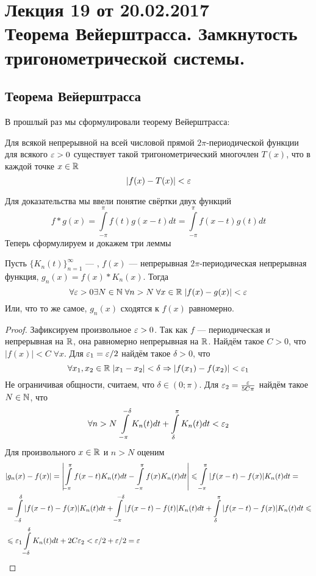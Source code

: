 \pagestyle{fancy}
\section{Лекция 19 от 20.02.2017 \\  Теорема Вейерштрасса. Замкнутость тригонометрической системы.}
\subsection{Теорема Вейерштрасса}
В прошлый раз мы сформулировали теорему Вейерштрасса:
\begin{Theorem}
	Для всякой непрерывной на всей числовой прямой $2\pi$-периодической функции для всякого $\varepsilon>0$ существует такой тригонометрический многочлен $T(x)$, что в каждой точке $x \in \mathbb{R}$ $$
	 |f(x)-T(x)| < \varepsilon
	$$
\end{Theorem}
	Для доказательства мы ввели понятие свёртки двух функций
	$$
		f*g(x) = \int\limits_{-\pi}^{\pi} f(t)g(x-t)dt = \int\limits_{-\pi}^{\pi}f(x-t)g(t)dt
	$$
	Теперь сформулируем и докажем три леммы
\begin{Lemma}
	Пусть $\{K_n(t)\}_{n=1}^{\infty}$ --- \lmao, $f(x)$ --- непрерывная $2\pi$-периодическая непрерывная функция, $g_n(x) = f(x)*K_n(x)$. Тогда 
	$$
		\forall \varepsilon>0 \exists N\in \mathbb{N}\; \forall n>N\; \forall x\in\mathbb{R}\; |f(x) - g(x)| < \varepsilon
	$$
	Или, что то же самое, $g_n(x)$ сходятся к $f(x)$ равномерно.
	\begin{proof}
		Зафиксируем произвольное $\varepsilon > 0$. Так как $f$ --- периодическая и непрерывная на $\mathbb{R}$, она равномерно непрерывная на $\mathbb{R}$. Найдём такое $C>0$, что $|f(x)| <C\; \forall x$. Для $\varepsilon_1 = \varepsilon/2$ найдём такое $\delta > 0$, что
		$$
			\forall x_1, x_2\in  \mathbb{R}\; |x_1-x_2| < \delta \Rightarrow |f(x_1) - f(x_2)| < \varepsilon_1 
		$$
		Не ограничивая общности, считаем, что $\delta \in (0; \pi)$.
		Для $\varepsilon_2 = \frac{\varepsilon}{5C\pi}$ найдём такое $N\in \mathbb{N}$, что
		$$
			\forall n>N\; \int\limits_{-\pi}^{-\delta}  K_n(t)dt+ \int\limits_{\delta}^{\pi} K_n(t)dt < \varepsilon_2
		$$
		Для произвольного $x\in \mathbb{R}$ и $n >N$ оценим
		\begin{align*}
			&|g_n(x) - f(x)|= \left| \int \limits_{-\pi}^{\pi}f(x-t)K_n(t)dt - \int \limits_{-\pi}^{\pi}f(x)K_n(t)dt\right| \leqslant \int \limits_{-\pi}^{\pi}|f(x-t) -f(x)|K_n(t) dt =\\&= \int \limits_{-\delta}^{\delta}|f(x-t) - f(x)|K_n(t)dt + \int \limits_{-\pi}^{-\delta}|f(x-t) - f(t)|K_n(t)dt + \int \limits_{\delta}^{\pi}|f(x-t) - f(x)|K_n(t)dt \leqslant \\ &\leqslant
			\varepsilon_1 \int \limits_{-\delta}^{\delta}K_n(t)dt + 2C\varepsilon_2 < \varepsilon/2 + \varepsilon/2 = \varepsilon
		\end{align*}
	\end{proof}
\end{Lemma}
